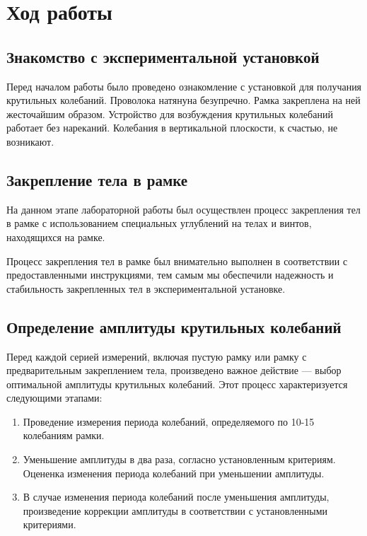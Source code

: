 \section{Ход работы}
\subsection{Знакомство с экспериментальной установкой}

Перед началом работы было проведено ознакомление с установкой для получания крутильных колебаний. Проволока натянуна безупречно. Рамка закреплена на ней жесточайшим образом. Устройство для возбуждения крутильных колебаний работает без нареканий. Колебания в вертикальной плоскости, к счастью, не возникают.

\subsection{Закрепление тела в рамке}

На данном этапе лабораторной работы был осуществлен процесс закрепления тел в рамке с использованием специальных углублений на телах и винтов, находящихся на рамке. 

Процесс закрепления тел в рамке был внимательно выполнен в соответствии с предоставленными инструкциями, тем самым мы обеспечили надежность и стабильность закрепленных тел в экспериментальной установке.

\subsection{Определение амплитуды крутильных колебаний}

Перед каждой серией измерений, включая пустую рамку или рамку с предварительным закреплением тела, произведено важное действие — выбор оптимальной амплитуды крутильных колебаний. Этот процесс характеризуется следующими этапами:

\begin{enumerate}
    \item Проведение измерения периода колебаний, определяемого по 10-15 колебаниям рамки.
    \item Уменьшение амплитуды в два раза, согласно установленным критериям. Оцененка изменения периода колебаний при уменьшении амплитуды.
    \item В случае изменения периода колебаний после уменьшения амплитуды, произведение коррекции амплитуды в соответствии с установленными критериями.
    \end{enumerate}

